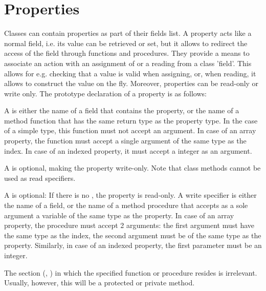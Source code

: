 \section{Properties}
Classes can contain properties as part of their fields list. A property
acts like a normal field, i.e. its value can be retrieved or set, but it
allows to redirect the access of the field through functions and
procedures. They provide a means to associate an action with an assignment
of or a reading from a class 'field'. This allows for e.g. checking that a
value is valid when assigning, or, when reading, it allows to construct the
value on the fly. Moreover, properties can be read-only or write only.
The prototype declaration of a property is as follows:


A   is either the name of a field that contains the
property, or the name of a method function that has the same return type as
the property type. In the case of a simple type, this
function must not accept an argument. In case of an array property, the
function must accept a single argument of the same type as the index.
In case of an indexed property, it must accept a integer as an argument.

A  is optional, making the property write-only. 
Note that class methods cannot be used as read specifiers.

A   is optional: If there is no , the
property is read-only. A write specifier is either the name of a field, or
the name of a method procedure that accepts as a sole argument a variable of
the same type as the property. In case of an array property, the procedure
must accept 2 arguments: the first argument must have the same type as the
index, the second argument must be of the same type as the property.
Similarly, in case of an indexed property, the first parameter must be an integer.

The section  (, ) 
in which the specified function or procedure resides is irrelevant. Usually, 
however, this will be a protected or private method.

